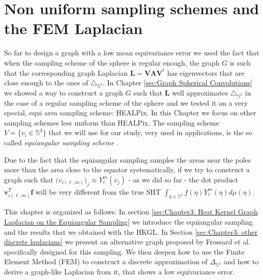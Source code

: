 

\section{Non uniform sampling schemes and the FEM Laplacian}

So far to design a graph with a low mean equivariance error we used the fact that when the sampling scheme of the sphere is regular enough, the graph $G$ is such that the corresponding graph Laplacian $\mathbf {L=V\Lambda V}^t$ has eigenvectors that are close enough to the ones of $\triangle_{\mathbb S^2}$. In Chapter \ref{sec:Graph Spherical Convolutions} we showed a way to construct a graph $G$ such that $\mathbf L$ well approximates $\triangle_{\mathbb S^2}$ in the case of a regular sampling scheme of the sphere and we tested it on a very special, equi area sampling scheme: HEALPix. In this Chapter we focus on other sampling schemes less uniform than HEALPix. The sampling scheme $V=\{v_i\in \mathbb S^2\}$ that we will use for our study, very used in applications, is the so called \textit{equiangular sampling scheme} \cite{Driscoll:1994:CFT:184069.184073}. 

\begin{snugshade*}
	 Due to the fact that the equiangular sampling samples the areas near the poles more than the area close to the equator systematically, if we try to construct a graph such that $\mathbf (v_{i(\ell, m)})_j \approx Y_\ell^m(v_j)$ - as we did so far - the dot product $\mathbf v^T_{i(\ell, m)} \mathbf f$ will be very different from the true SHT $\int_{\eta \in \mathbb S^2}f(\eta)Y_\ell^m(\eta)d\mu(\eta)$.
\end{snugshade*} 


This chapter is organized as follows: In section \ref{sec:Chapter3: Heat Kernel Graph Laplacian on the Equiangular Sampling} we introduce the equiangular sampling and the results that we obtained with the HKGL. In Section \ref{sec:Chapter3: other discrete laplacians} we present an alternative graph proposed by Frossard et al. \cite{Frossard2017GraphBasedCO} specifically designed for this sampling. We then deepen how to use the Finite Element Method (FEM) to construct a discrete approximation of $\Delta _{\mathbb S^2}$ and how to derive a graph-like Laplacian from it, that shows a low equivariance error.
